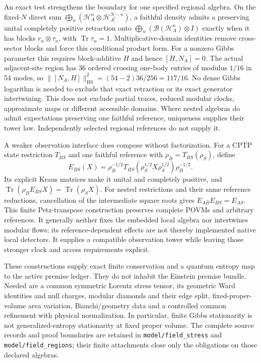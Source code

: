 An exact test strengthens the boundary for one specified regional algebra.
On the fixed-$N$ direct sum
$\bigoplus_n(\mathcal H_A^n\otimes\mathcal H_{A^c}^{N-n})$, a faithful
density admits a preserving unital completely positive retraction onto
$\bigoplus_n(\mathcal B(\mathcal H_A^n)\otimes I)$ exactly when it has
blocks $r_n\otimes\tau_n$, with $\operatorname{Tr}\tau_n=1$.
Multiplicative-domain identities remove cross-sector blocks and force
this conditional product form. For a nonzero Gibbs parameter this requires
block-additive $H$ and hence $[H,N_A]=0$. The actual adjacent-site region
has 36 ordered crossing one-body entries of modulus $1/16$ in 54 modes,
so $\|[N_A,H]\|_{\mathrm{HS}}^2=(54-2)36/256=117/16$.
No dense Gibbs logarithm is needed to exclude that exact retraction or
its exact generator intertwining. This does not exclude partial traces,
reduced modular clocks, approximate maps or different accessible domains.
Where nested algebras do admit expectations preserving one faithful
reference, uniqueness supplies their tower law. Independently selected
regional references do not supply it.

A weaker observation interface does compose without factorization. For a
CPTP state restriction $T_{BS}$ and one faithful reference with
$\rho_B=T_{BS}(\rho_S)$, define
\[
 E_{BS}(X)=\rho_B^{-1/2}
 T_{BS}(\rho_S^{1/2}X\rho_S^{1/2})\rho_B^{-1/2}.
\]
Its explicit Kraus matrices make it unital and completely positive, and
$\operatorname{Tr}(\rho_BE_{BS}X)=\operatorname{Tr}(\rho_SX)$.
For nested restrictions and their same reference reductions, cancellation
of the intermediate square roots gives $E_{AB}E_{BS}=E_{AS}$.
This finite Petz-transpose construction preserves complete POVMs and
arbitrary references. It generally neither fixes the embedded local
algebra nor intertwines modular flows; its reference-dependent effects
are not thereby implemented native local detectors. It supplies a
compatible observation tower while leaving those stronger clock and access
requirements explicit.

These constructions supply exact finite conservation and a quantum entropy
map to the active premise ledger. They do not inhabit the Einstein premise
bundle. Needed are a common symmetric Lorentz stress tensor, its
geometric Ward identities and null charges, modular diamonds and their
edge split, fixed-proper-volume area variation, Bianchi/geometry data and
a controlled common refinement with physical normalization. In particular,
finite Gibbs stationarity is not generalized-entropy stationarity at fixed
proper volume. The complete source records and proof boundaries are
retained in \texttt{model/field\_stress} and
\texttt{model/field\_regions}; their finite attachments close only the
obligations on those declared algebras.

